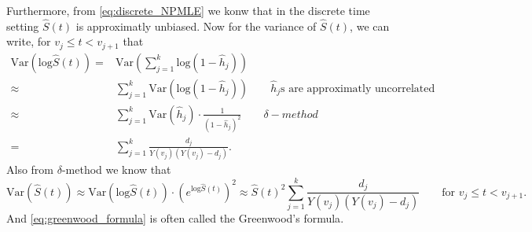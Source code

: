 \documentclass[a4paper,12pt]{article}
\begin{document}
\par

Furthermore, from \eqref{eq:discrete_NPMLE} we konw that in the discrete time setting $\hat{S}\left(t\right)$ is approximatly unbiased. Now for the variance of $\hat{S}\left(t\right)$, we can write, for $v_j \leq t < v_{j + 1}$ that
\[
  \begin{aligned}
    \mathrm{Var}\left(\mathrm{log}\hat{S}\left(t\right)\right)
    =& \mathrm{Var}\left(
       \sum\limits_{j = 1}^k\mathrm{log}\left(1 - \hat{h}_j\right)
       \right)    \\
    \approx& \sum\limits_{j = 1}^k\mathrm{Var}\left(
       \mathrm{log}\left(1 - \hat{h}_j\right)
       \right)
             \quad\quad \hat{h}_j\text{s are approximatly uncorrelated}    \\
    \approx& \sum\limits_{j = 1}^k
             \mathrm{Var}\left(\hat{h}_j\right)
             \cdot
             \frac{1}{\left(1 - \hat{h}_j\right)^2}
             \quad\quad \delta-method    \\
    =& \sum\limits_{j = 1}^k
       \frac{d_j}{Y\left(v_j\right)\left(Y\left(v_j\right) - d_j\right)}
       .
  \end{aligned}
\]
Also from $\delta$-method we know that
\begin{equation}
  \label{eq:greenwood_formula}
    \mathrm{Var}\left(\hat{S}\left(t\right)\right)
  \approx
  \mathrm{Var}\left(\mathrm{log}\hat{S}\left(t\right)\right)
  \cdot
  \left(
    e^{\mathrm{log}\hat{S}\left(t\right)}
  \right)^2
  \approx
  \hat{S}\left(t\right)^2
  \sum\limits_{j = 1}^k
  \frac{d_j}{Y\left(v_j\right)\left(Y\left(v_j\right) - d_j\right)}
  \quad\quad \text{for } v_j \leq t < v_{j + 1}.
\end{equation}
And \eqref{eq:greenwood_formula} is often called the {\color{red}Greenwood's formula}.







\end{document}
